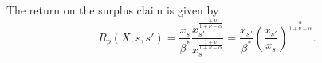 The return on the surplus claim is given by
\begin{equation}
    R_p(X,s,s') = \frac{x_s}{\beta^*} \frac{x_{s'}^{\frac{1+\nu}{1+\nu-\alpha}}}{x_s^{\frac{1+\nu}{1+\nu-\alpha}}} = \frac{x_{s'}}{\beta^*} \left( \frac{x_{s'}}{x_s} \right)^{ \frac{\alpha}{1+\nu-\alpha} }.
\end{equation}


















